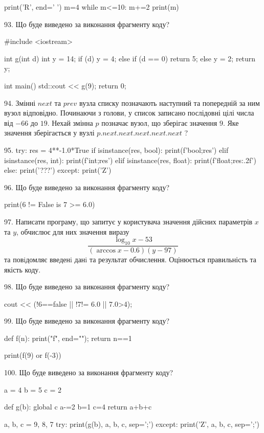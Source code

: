 \documentclass[11pt]{article}
\begin{document}
print('R', end=' ')
m=4
while m<=10:
    m+=2
print(m)



93. Що буде виведено за виконання фрагменту коду?

#include <iostream>

int g(int d){
    int y = 14;
    if (d) 
        y = 4;
    else if (d == 0)
         return 5;
    else
         y = 2;
    return y;
}

int main(){
    std::cout << g(9);
    return 0;
}



94. 
Змінні $next$ та $prev$ вузла списку позначають наступний та попередній за ним вузол відповідно. Починаючи з голови, у список записано послідовні цілі числа від $-66$ до $19$. Нехай змінна $p$ позначає вузол, що зберігає значення $9$.
Яке значення зберігається у вузлі $p.next.next.next.next.next$ ?


95. 
try:
    res = 4**-1.0*True
    if isinstance(res, bool):
        print(f'bool;{res}')
    elif isinstance(res, int):
        print(f'int;{res}')
    elif isinstance(res, float):
        print(f'float;{res:.2f}')
    else:
        print('???')
except:
    print('Z')


96. Що буде виведено за виконання фрагменту коду?

print(6 != False is 7 >= 6.0)


97. 
Написати програму, що запитує у користувача значення дійсних параметрів $x$ та $y$, обчислює для них значення виразу 
$$\frac{\log_{10} x - 53}{(\arccos x - 0.6) (y - 97)}$$ 
та повiдомляє введенi данi та результат обчислення.
 Оцінюється правильність та якість коду.



98. Що буде виведено за виконання фрагменту коду?

cout << (!6==false || !7!= 6.0 || 7.0>4);


99. Що буде виведено за виконання фрагменту коду?

def f(n):
    print("f", end="");
    return n==1

print(f(9) or f(-3))


100. Що буде виведено за виконання фрагменту коду?

a = 4
b = 5
c = 2

def g(b):
global c    a-=2
    b=1
    c=4
    return a+b+c

a, b, c = 9, 8, 7
try:
    print(g(b), a, b, c, sep=';')
except:
    print('Z', a, b, c, sep=';')


\newpage
\end{document}
